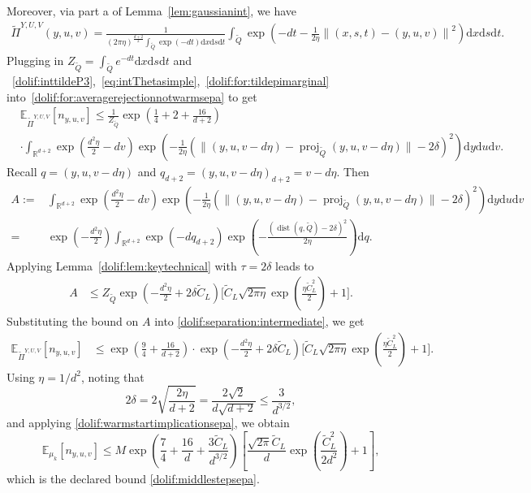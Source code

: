 \documentclass[11pt,letterpaper]{article}
\newcommand{\R}{\mathbb{R}}
\newcommand{\norm}[1]{\left\lVert #1 \right\rVert}
\newcommand{\Q}{\widetilde{Q}}
\newcommand{\E}{\mathbb{E}}
\newcommand{\dist}{\operatorname{dist}}
\newcommand{\nn}{\nonumber}
\newcommand{\D}{\mathrm{d}}
\newcommand{\brac}[1]{\left( #1\right)}
\begin{document}
Moreover, via part a of Lemma~\ref{lem:gaussianint},  we have %
\begin{align}
\label{dolif:for:tildepimarginal}
   \widetilde{\Pi}^{Y,U,V}(y,u,v)=\frac{1}{(2\pi \eta)^{\frac{d+2}{2}} \int_{\Q} \exp(- d t)\D x \D s \D t}\int_{\Q} \exp\brac{- d t-\frac{1}{2\eta}\norm{(x,s,t)-(y,u,v)}^2 }\D x \D s \D t.
   \end{align}
Plugging in $Z_{\Q}=\int_{\Q} e^{-dt}\D x\D s\D t$ and ~\eqref{dolif:inttildeP3},~\eqref{eq:intThetasimple},~\eqref{dolif:for:tildepimarginal} into~\eqref{dolif:for:averagerejectionnotwarmsepa} to get
\begin{align}
\label{dolif:separation:intermediate}
    & \E_{\widetilde{\Pi}^{Y,U,V}} [n_{y,u,v}]
     \leq \frac{1}{Z_{\Q}}\exp\brac{\frac{1}{4}+2+\frac{16}{d+2}}\nn\\&\cdot
     \int_{\R^{d+2}}\exp\brac{\frac{d^2\eta}{2} - d v }
     \exp\brac{-\frac{1}{2\eta}\left(\| (y,u,v-d\eta)-\operatorname{proj}_{\Q}(y,u,v-d\eta)\| - 2\delta\right)^2 } \D y \D u \D v .
\end{align}
Recall $ q=(y,u,v-d\eta)$ and $ q_{d+2}=(y,u,v-d\eta)_{d+2}=v-d\eta$. Then
\begin{align*}
  A:=&
  \int_{\R^{d+2}}\exp\brac{\frac{d^2\eta}{2} - d v }
  \exp\brac{-\frac{1}{2\eta}\left(\| (y,u,v-d\eta)-\operatorname{proj}_{\Q}(y,u,v-d\eta)\| - 2\delta\right)^2 } \D y \D u \D v\\
  =&\exp\brac{-\frac{d^2\eta}{2}}
  \int_{\R^{d+2}} \exp(-d q_{d+2})
  \exp\left(-\frac{\left(\dist( q,\Q)- 2\delta\right)^2}{2\eta}\right)  \D  q.
\end{align*}
Applying Lemma~\ref{dolif:lem:keytechnical} with $\tau=2\delta$ leads to 
\begin{align*}
A
&\leq Z_{\Q} \exp\brac{-\frac{d^2\eta}{2}+2\delta \widetilde{C}_L}
\Biggl[
\widetilde{C}_L\sqrt{2\pi\eta}\exp \left(\frac{\eta \widetilde{C}_L^2}{2}\right)
+1\Biggr].
\end{align*}
Substituting the bound on $A$ into \eqref{dolif:separation:intermediate}, we get
\begin{align*}
 \E_{\widetilde{\Pi}^{Y,U,V}} [n_{y,u,v}]
 &\leq
 \exp\brac{\frac{9}{4}+\frac{16}{d+2}} \cdot \exp\brac{-\frac{d^2\eta}{2}+2\delta \widetilde{C}_L}
\Biggl[
\widetilde{C}_L\sqrt{2\pi\eta}\exp \left(\frac{\eta \widetilde{C}_L^2}{2}\right)
+1\Biggr].
\end{align*}
Using $\eta=1/d^2$, noting that
\[
2\delta=2\sqrt{ \frac{2\eta}{d+2}}=\frac{2\sqrt{2}}{d\sqrt{d+2}} \le \frac{3}{d^{3/2}},
\]
and applying \eqref{dolif:warmstartimplicationsepa}, we obtain
\[
\E_{\mu_k}[n_{y,u,v}]
\le
M \exp\!\left(\frac74+\frac{16}{d}+ \frac{3\widetilde{C}_L}{d^{3/2}}\right)
\left[
\frac{\sqrt{2\pi} \widetilde C_L}{d} \exp\!\left(\frac{ \widetilde C_L^2}{2d^2}\right)
+1 \right],
\]
which is the declared bound \eqref{dolif:middlestepsepa}.
\end{document}

